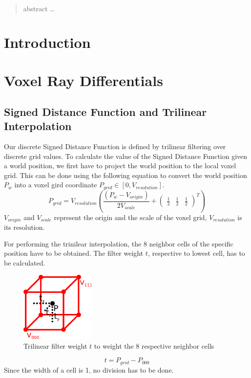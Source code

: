 \documentclass[12pt]{article}
\begin{document}
	
\maketitle

\begin{abstract}
abstract \ldots
\end{abstract}

\section{Introduction}

\section{Voxel Ray Differentials}

\subsection{Signed Distance Function and Trilinear Interpolation}
Our discrete Signed Distance Function is defined by trilinear filtering over discrete grid values. To calculate the value of the Signed Distance Function given a world position, we first have to project the world position to the local voxel grid. This can be done using the following equation to convert the world position $P_{w}$ into a voxel gird coordinate $P_{grid} \in [0, V_{resolution}]$.
\begin{equation}
P_{grid} = V_{resolution} \left(\frac{\left(P_{w} - V_{origin}\right)}{2V_{scale}}  + \begin{pmatrix}\frac{1}{2} & \frac{1}{2} & \frac{1}{2}\end{pmatrix}^T \right) 
\end{equation}
$V_{origin}$ and $V_{scale}$ represent the origin and the scale of the voxel grid, $V_{resolution}$ is its resolution.

For performing the trinilear interpolation, the 8 neighbor cells of the specific position have to be obtained. The filter weight $t$, respective to lowest cell, has to be calculated.

\begin{figure}[H]
	\caption{Trilinear filter weight $t$ to weight the 8 respective neighbor cells}
	\centering
	\includegraphics[width=10em]{images/trilinear_filter_weight}
\end{figure}
\begin{equation}
t = P_{grid} - P_{000}
\end{equation}
Since the width of a cell is 1, no division has to be done.
\end{document}
